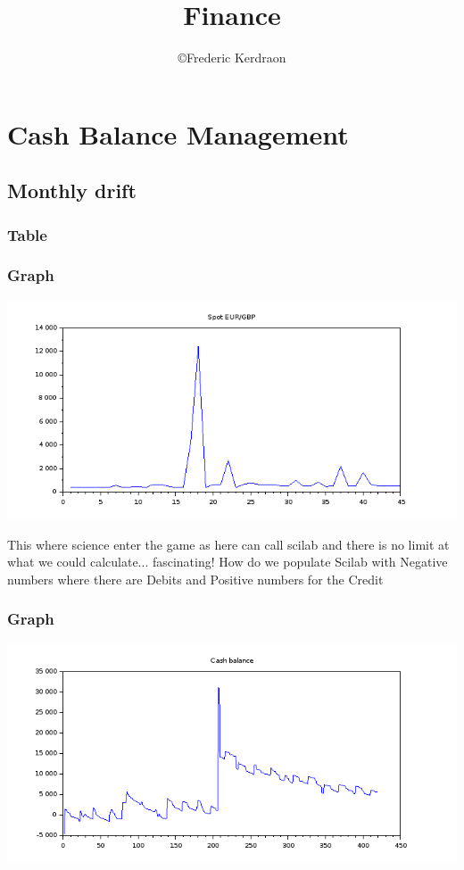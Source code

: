 \documentclass[8pt]{article} %
\title{Finance}
\author{\copyright Frederic Kerdraon}
\begin{document}
\maketitle
\tableofcontents

\section{Cash Balance Management}

\subsection{Monthly drift}

\subsubsection{Table}
%


\subsubsection{Graph}
\includegraphics[scale=0.6]{Vector.png}

This where science enter the game as here can call scilab and there is no limit at what we could calculate... fascinating!
How do we populate Scilab with Negative numbers where there are Debits and Positive numbers for the Credit
\subsubsection{Graph}
\includegraphics[scale=0.6]{Scilab-cashBalance.png}
\end{document}
